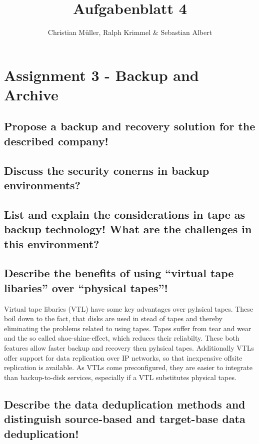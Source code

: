 \documentclass{article}
\title{Aufgabenblatt 4}
\author{Christian Müller, Ralph Krimmel \& Sebastian Albert }
\begin{document}
\maketitle

\section*{Assignment 3 - Backup and Archive}

\subsection{Propose a backup and recovery solution for the described company!}

\subsection{Discuss the security conerns in backup environments?}

\subsection{List and explain the considerations in tape as backup technology!
				What are the challenges in this environment?}

\subsection{Describe the benefits of using ``virtual tape libaries'' over ``physical tapes''!}
	Virtual tape libaries (VTL) have some key advantages over pyhsical tapes.
	These boil down to the fact,
	that disks are used in stead of tapes
	and thereby eliminating the problems related to using tapes.
	Tapes suffer from tear and wear and the so called shoe-shine-effect,
	which reduces their reliabilty.
	These both features allow faster backup and recovery
	then pyhsical tapes.
	Additionally VTLs offer support for data replication over IP networks,
	so that inexpensive offsite replication is available.
	As VTLs come preconfigured,
	they are easier to integrate than backup-to-disk services,
	especially if a VTL substitutes physical tapes.

\subsection{Describe the data deduplication methods and distinguish source-based and target-base data deduplication!}
\end{document}
